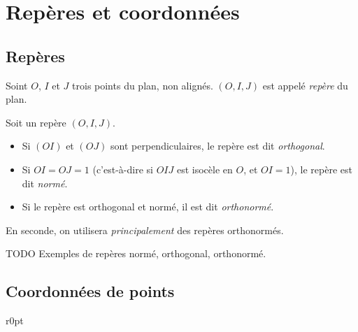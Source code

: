 \section{Repères et coordonnées}

\subsection{Repères}

\begin{definition}
  Soint $O$, $I$ et $J$ trois points du plan, non alignés.
  $(O, I, J)$ est appelé \emph{repère} du plan.
\end{definition}

\begin{definition}Soit un repère $(O, I, J)$.
  \begin{itemize}
    \item Si $(OI)$ et $(OJ)$ sont perpendiculaires, le repère est dit \emph{orthogonal}.
    \item Si $OI=OJ=1$ (c'est-à-dire si $OIJ$ est isocèle en $O$, et $OI=1$), le repère est dit \emph{normé}.
    \item Si le repère est orthogonal et normé, il est dit \emph{orthonormé}.
  \end{itemize}
\end{definition}

\begin{remarque}
  En seconde, on utilisera \emph{principalement} des repères orthonormés.
\end{remarque}

\begin{exemple}TODO Exemples de repères normé, orthogonal, orthonormé.
\end{exemple}

\subsection{Coordonnées de points}

\begin{wrapfigure}{r}{0pt}
  \centering
{}
\end{wrapfigure}
~

